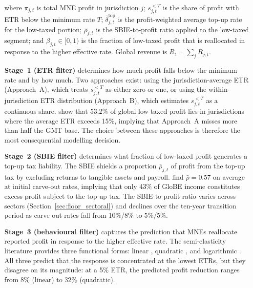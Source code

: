 \documentclass[11pt,a4paper]{article}
\begin{document}
where $\pi_{j,t}$ is total MNE profit in jurisdiction $j$; $s_{j,t}^{<T}$ is the share of profit with ETR below the minimum rate $T$; $\bar{\delta}_{j,t}^{\text{top}}$ is the profit-weighted average top-up rate for the low-taxed portion; $\bar{\rho}_{j,t}$ is the SBIE-to-profit ratio applied to the low-taxed segment; and $\beta_{j,t} \in [0,1)$ is the fraction of low-taxed profit that is reallocated in response to the higher effective rate. Global revenue is $R_t = \sum_j R_{j,t}$.

\textbf{Stage~1 (ETR filter)} determines how much profit falls below the minimum rate and by how much. Two approaches exist: using the jurisdiction-average ETR (Approach~A), which treats $s_{j,t}^{<T}$ as either zero or one, or using the within-jurisdiction ETR distribution (Approach~B), which estimates $s_{j,t}^{<T}$ as a continuous share. \citet{hugger2026} show that 53.2\% of global low-taxed profit lies in jurisdictions where the average ETR exceeds 15\%, implying that Approach~A misses more than half the GMT base. The choice between these approaches is therefore the most consequential modelling decision.

\textbf{Stage~2 (SBIE filter)} determines what fraction of low-taxed profit generates a top-up tax liability. The SBIE shields a proportion $\bar{\rho}_{j,t}$ of profit from the top-up tax by excluding returns to tangible assets and payroll. \citet{devereux2023} find $\bar{\rho} = 0.57$ on average at initial carve-out rates, implying that only 43\% of GloBE income constitutes excess profit subject to the top-up tax. The SBIE-to-profit ratio varies across sectors (Section~\ref{sec:floor_sectoral}) and declines over the ten-year transition period as carve-out rates fall from 10\%/8\% to 5\%/5\%.

\textbf{Stage~3 (behavioural filter)} captures the prediction that MNEs reallocate reported profit in response to the higher effective rate. The semi-elasticity literature provides three functional forms: linear \citep{heckemeyer2017}, quadratic \citep{dowd2017}, and logarithmic \citep{garcia-bernardo2024}. All three predict that the response is concentrated at the lowest ETRs, but they disagree on its magnitude: at a 5\% ETR, the predicted profit reduction ranges from 8\% (linear) to 32\% (quadratic).
\end{document}
